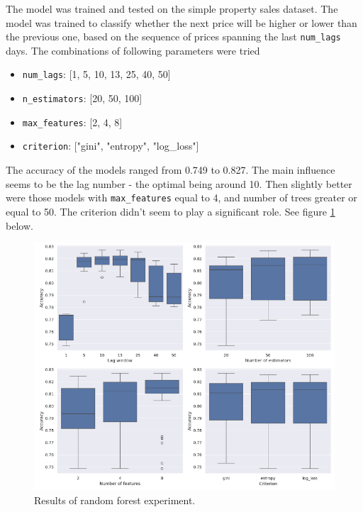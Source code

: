 The model was trained and tested on the simple property sales dataset.
The model was trained to classify whether the next price will be higher or lower than the previous one, based on the sequence of prices spanning the last \verb|num_lags| days.
The combinations of following parameters were tried

\noindent
\begin{itemize}
	\item \verb|num_lags|: [1, 5, 10, 13, 25, 40, 50]
	\item \verb|n_estimators|: [20, 50, 100]
	\item \verb|max_features|: [2, 4, 8]
	\item \verb|criterion|: ["gini", "entropy", "log\_loss"]
\end{itemize}

The accuracy of the models ranged from 0.749 to 0.827. The main influence seems to be the lag number - the optimal being around 10. Then slightly better were those models with \verb|max_features| equal to 4, and number of trees greater or equal to 50. The criterion didn't seem to play a significant role. See figure \ref{fig:random_forest_fig} below.

\begin{figure}[h!]
	\includegraphics[width=\linewidth]{"pictures/random_forest_results.png"}
	\caption{Results of random forest experiment.}
	\label{fig:random_forest_fig}
\end{figure}















